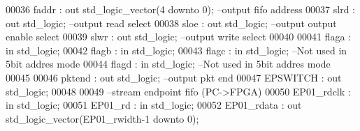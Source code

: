 \begin{DoxyCode}
00036                 \textcolor{vhdlchar}{faddr}                   \textcolor{vhdlchar}{:} \textcolor{keywordflow}{out} \textcolor{comment}{std\_logic\_vector}\textcolor{vhdlchar}{(}\textcolor{vhdllogic}{}\textcolor{vhdllogic}{4} \textcolor{keywordflow}{downto} \textcolor{vhdllogic}{}\textcolor{vhdllogic}{0}\textcolor{vhdlchar}{)};\textcolor{keyword}{         --output fifo address}
00037                 \textcolor{vhdlchar}{slrd}                    \textcolor{vhdlchar}{:} \textcolor{keywordflow}{out} \textcolor{comment}{std\_logic};\textcolor{keyword}{                                    --output read
       select}
00038                 \textcolor{vhdlchar}{sloe}                    \textcolor{vhdlchar}{:} \textcolor{keywordflow}{out} \textcolor{comment}{std\_logic};\textcolor{keyword}{                                    --output output
       enable select}
00039                 \textcolor{vhdlchar}{slwr}                    \textcolor{vhdlchar}{:} \textcolor{keywordflow}{out} \textcolor{comment}{std\_logic};\textcolor{keyword}{                                    --output write
       select}
00040                                   
00041                 flaga                   : \textcolor{keywordflow}{in} \textcolor{comment}{std\_logic};                                
00042                 flagb                   : \textcolor{keywordflow}{in} \textcolor{comment}{std\_logic};
00043                 flagc                   : \textcolor{keywordflow}{in} \textcolor{comment}{std\_logic};                                 --Not used \textcolor{keywordflow}{in} 5bit 
      addres mode
00044                 flagd                   : \textcolor{keywordflow}{in} \textcolor{comment}{std\_logic};                                 --Not used \textcolor{keywordflow}{in} 5bit 
      addres mode
00045 
00046                 \textcolor{vhdlchar}{pktend}              \textcolor{vhdlchar}{:} \textcolor{keywordflow}{out} \textcolor{comment}{std\_logic};\textcolor{keyword}{                                    --output pkt end }
00047                 \textcolor{vhdlchar}{EPSWITCH}                    \textcolor{vhdlchar}{:} \textcolor{keywordflow}{out} \textcolor{comment}{std\_logic};
00048         
00049 \textcolor{keyword}{                --stream endpoint fifo (PC->FPGA) }
00050                 \textcolor{vhdlchar}{EP01_rdclk}      \textcolor{vhdlchar}{:} \textcolor{keywordflow}{in} \textcolor{comment}{std\_logic};
00051                 \textcolor{vhdlchar}{EP01_rd}         \textcolor{vhdlchar}{:} \textcolor{keywordflow}{in} \textcolor{comment}{std\_logic};
00052                 \textcolor{vhdlchar}{EP01_rdata}      \textcolor{vhdlchar}{:} \textcolor{keywordflow}{out} \textcolor{comment}{std\_logic\_vector}\textcolor{vhdlchar}{(}\textcolor{vhdlchar}{EP01_rwidth}\textcolor{vhdlchar}{-}\textcolor{vhdllogic}{}\textcolor{vhdllogic}{1} \textcolor{keywordflow}{downto} \textcolor{vhdllogic}{}\textcolor{vhdllogic}{0}\textcolor{vhdlchar}{)};

\end{DoxyCode}
